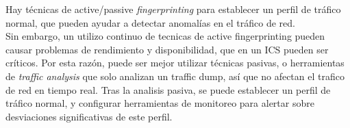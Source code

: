 Hay técnicas de active/passive \textit{fingerprinting} para establecer un perfil de tráfico normal, que pueden ayudar a detectar anomalías en el tráfico de red.\\
Sin embargo, un utilizo continuo de tecnicas de active fingerprinting pueden causar problemas de rendimiento y disponibilidad, que en un ICS pueden ser críticos.
Por esta  razón, puede ser mejor utilizar técnicas pasivas, o herramientas de \textit{traffic analysis} que solo analizan un traffic dump, así que no afectan el trafico de red en tiempo real.
Tras la analisis pasiva, se puede establecer un perfil de tráfico normal, y configurar herramientas de monitoreo para alertar sobre desviaciones significativas de este perfil.







    
